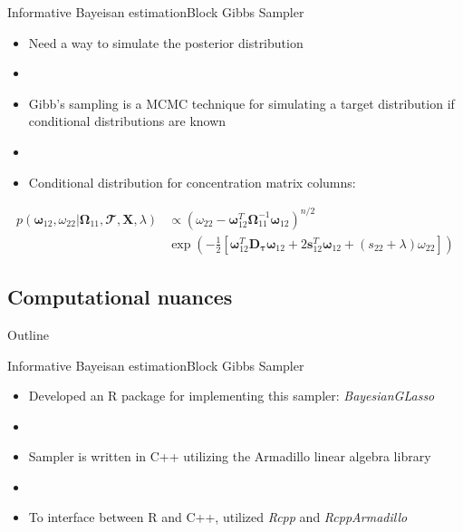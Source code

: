 \documentclass[xcolor=dvipsnames]{beamer}
\begin{document}
\begin{frame}{Informative Bayeisan estimation}{Block Gibbs Sampler}
	\vspace{-10.5pt}
	\begin{itemize}
		\item Need a way to simulate the posterior distribution 
		\item[]
		\item Gibb's sampling is a MCMC technique for simulating a target distribution if conditional distributions are known
		\item[]
		\item Conditional distribution for concentration matrix columns:
	\end{itemize}
	\begin{align*}
	p(\boldsymbol{\omega}_{12}, \omega_{22}|\boldsymbol{\Omega}_{11},\mathbfcal{T},\textbf{X},\lambda) & \propto \left(\omega_{22}-\boldsymbol{\omega}_{12}^T \boldsymbol{\Omega}_{11}^{-1}\boldsymbol{\omega}_{12} \right)^{n/2} \\ &\exp \left( - \frac{1}{2}\left[ \boldsymbol{\omega}_{12}^T \textbf{D}_{\boldsymbol{\tau}} \boldsymbol{\omega}_{12}+ 2 
	\textbf{s}_{12}^T \boldsymbol{\omega}_{12} + (s_{22}+\lambda)\omega_{22}\right] \right)
	\end{align*}
\end{frame}

\subsection{Computational nuances}
\begin{frame}{Outline}
	\vspace{-10.5pt}
	\tableofcontents[currentsection,subsectionstyle=show/shaded/hide]
\end{frame}
\begin{frame}{Informative Bayeisan estimation}{Block Gibbs Sampler}
	\vspace{-15.5pt}
	\begin{itemize}
		\item Developed an R package for implementing this sampler: \emph{BayesianGLasso}
		\item[]
		\item Sampler is written in C++ utilizing the Armadillo linear algebra library
		\item[]
		\item To interface between R and C++, utilized \emph{Rcpp} and \emph{RcppArmadillo}
	\end{itemize}
\end{frame}
\end{document}
